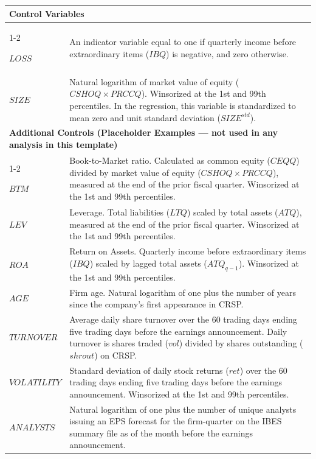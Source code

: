 \documentclass[english,12pt]{article}
\begin{document}
\begin{longtable}{p{3.8cm}p{12cm}}
\multicolumn{2}{l}{\textbf{Control Variables}}\\
\cmidrule{1-2}

$LOSS$ & An indicator variable equal to one if quarterly income before extraordinary items ($IBQ$) is negative, and zero otherwise. \\

$SIZE$ & Natural logarithm of market value of equity ($CSHOQ \times PRCCQ$). Winsorized at the 1st and 99th percentiles. In the regression, this variable is standardized to mean zero and unit standard deviation ($SIZE^{std}$). \\

\multicolumn{2}{l}{\textbf{Additional Controls (Placeholder Examples --- not used in any analysis in this template)}}\\
\cmidrule{1-2}

$BTM$ & Book-to-Market ratio. Calculated as common equity ($CEQQ$) divided by market value of equity ($CSHOQ \times PRCCQ$), measured at the end of the prior fiscal quarter. Winsorized at the 1st and 99th percentiles. \\

$LEV$ & Leverage. Total liabilities ($LTQ$) scaled by total assets ($ATQ$), measured at the end of the prior fiscal quarter. Winsorized at the 1st and 99th percentiles. \\

$ROA$ & Return on Assets. Quarterly income before extraordinary items ($IBQ$) scaled by lagged total assets ($ATQ_{q-1}$). Winsorized at the 1st and 99th percentiles. \\

$AGE$ & Firm age. Natural logarithm of one plus the number of years since the company's first appearance in CRSP. \\

$TURNOVER$ & Average daily share turnover over the 60 trading days ending five trading days before the earnings announcement. Daily turnover is shares traded ($vol$) divided by shares outstanding ($shrout$) on CRSP. \\

$VOLATILITY$ & Standard deviation of daily stock returns ($ret$) over the 60 trading days ending five trading days before the earnings announcement. Winsorized at the 1st and 99th percentiles. \\

$ANALYSTS$ & Natural logarithm of one plus the number of unique analysts issuing an EPS forecast for the firm-quarter on the IBES summary file as of the month before the earnings announcement. \\


\end{longtable}
\end{document}
